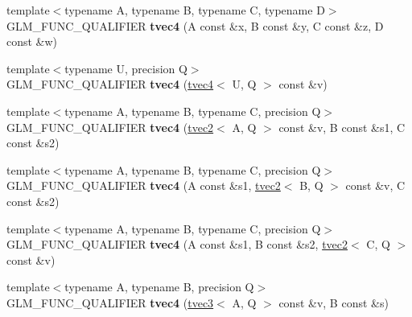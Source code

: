 \begin{DoxyCompactItemize}
\item 
\hypertarget{structglm_1_1detail_1_1tvec4_ad49650086418f165378a3cb3bd6dff22}{{\footnotesize template$<$typename A, typename B, typename C, typename D$>$ }\\G\-L\-M\-\_\-\-F\-U\-N\-C\-\_\-\-Q\-U\-A\-L\-I\-F\-I\-E\-R {\bfseries tvec4} (A const \&x, B const \&y, C const \&z, D const \&w)}\label{structglm_1_1detail_1_1tvec4_ad49650086418f165378a3cb3bd6dff22}

\item 
\hypertarget{structglm_1_1detail_1_1tvec4_a6862f9f921f782523d5d9bfb099ce621}{{\footnotesize template$<$typename U, precision Q$>$ }\\G\-L\-M\-\_\-\-F\-U\-N\-C\-\_\-\-Q\-U\-A\-L\-I\-F\-I\-E\-R {\bfseries tvec4} (\hyperlink{structglm_1_1detail_1_1tvec4}{tvec4}$<$ U, Q $>$ const \&v)}\label{structglm_1_1detail_1_1tvec4_a6862f9f921f782523d5d9bfb099ce621}

\item 
\hypertarget{structglm_1_1detail_1_1tvec4_a88c6b7ecdef152cdf340eaf39b4e4606}{{\footnotesize template$<$typename A, typename B, typename C, precision Q$>$ }\\G\-L\-M\-\_\-\-F\-U\-N\-C\-\_\-\-Q\-U\-A\-L\-I\-F\-I\-E\-R {\bfseries tvec4} (\hyperlink{structglm_1_1detail_1_1tvec2}{tvec2}$<$ A, Q $>$ const \&v, B const \&s1, C const \&s2)}\label{structglm_1_1detail_1_1tvec4_a88c6b7ecdef152cdf340eaf39b4e4606}

\item 
\hypertarget{structglm_1_1detail_1_1tvec4_ad501d232fe0d59f7734803371445a9cd}{{\footnotesize template$<$typename A, typename B, typename C, precision Q$>$ }\\G\-L\-M\-\_\-\-F\-U\-N\-C\-\_\-\-Q\-U\-A\-L\-I\-F\-I\-E\-R {\bfseries tvec4} (A const \&s1, \hyperlink{structglm_1_1detail_1_1tvec2}{tvec2}$<$ B, Q $>$ const \&v, C const \&s2)}\label{structglm_1_1detail_1_1tvec4_ad501d232fe0d59f7734803371445a9cd}

\item 
\hypertarget{structglm_1_1detail_1_1tvec4_a5ba14812472c30b9d34fdafa413c1846}{{\footnotesize template$<$typename A, typename B, typename C, precision Q$>$ }\\G\-L\-M\-\_\-\-F\-U\-N\-C\-\_\-\-Q\-U\-A\-L\-I\-F\-I\-E\-R {\bfseries tvec4} (A const \&s1, B const \&s2, \hyperlink{structglm_1_1detail_1_1tvec2}{tvec2}$<$ C, Q $>$ const \&v)}\label{structglm_1_1detail_1_1tvec4_a5ba14812472c30b9d34fdafa413c1846}

\item 
\hypertarget{structglm_1_1detail_1_1tvec4_acdd7a9ea34155ac8f12b5959e599206b}{{\footnotesize template$<$typename A, typename B, precision Q$>$ }\\G\-L\-M\-\_\-\-F\-U\-N\-C\-\_\-\-Q\-U\-A\-L\-I\-F\-I\-E\-R {\bfseries tvec4} (\hyperlink{structglm_1_1detail_1_1tvec3}{tvec3}$<$ A, Q $>$ const \&v, B const \&s)}\label{structglm_1_1detail_1_1tvec4_acdd7a9ea34155ac8f12b5959e599206b}


\end{DoxyCompactItemize}
